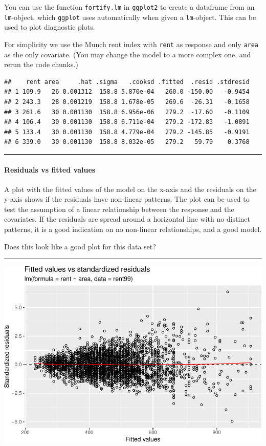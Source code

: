 \documentclass[
]{article}
\begin{document}
You can use the function \texttt{fortify.lm} in \texttt{ggplot2} to
create a dataframe from an \texttt{lm}-object, which \texttt{ggplot}
uses automatically when given a \texttt{lm}-object. This can be used to
plot diagnostic plots.

For simplicity we use the Munch rent index with \texttt{rent} as
response and only \texttt{area} as the only covariate. (You may change
the model to a more complex one, and rerun the code chunks.)

\footnotesize

\begin{verbatim}
##    rent area     .hat .sigma   .cooksd .fitted  .resid .stdresid
## 1 109.9   26 0.001312  158.8 5.870e-04   260.0 -150.00   -0.9454
## 2 243.3   28 0.001219  158.8 1.678e-05   269.6  -26.31   -0.1658
## 3 261.6   30 0.001130  158.8 6.956e-06   279.2  -17.60   -0.1109
## 4 106.4   30 0.001130  158.8 6.711e-04   279.2 -172.83   -1.0891
## 5 133.4   30 0.001130  158.8 4.779e-04   279.2 -145.85   -0.9191
## 6 339.0   30 0.001130  158.8 8.032e-05   279.2   59.79    0.3768
\end{verbatim}

\begin{center}\rule{0.5\linewidth}{0.5pt}\end{center}

\hypertarget{residuals-vs-fitted-values}{%
\paragraph{Residuals vs fitted
values}\label{residuals-vs-fitted-values}}

A plot with the fitted values of the model on the x-axis and the
residuals on the y-axis shows if the residuals have non-linear patterns.
The plot can be used to test the assumption of a linear relationship
between the response and the covariates. If the residuals are spread
around a horizontal line with no distinct patterns, it is a good
indication on no non-linear relationships, and a good model.

Does this look like a good plot for this data set?

\begin{center}\rule{0.5\linewidth}{0.5pt}\end{center}

\includegraphics{2MLR_files/figure-latex/unnamed-chunk-9-1.pdf}
\end{document}

